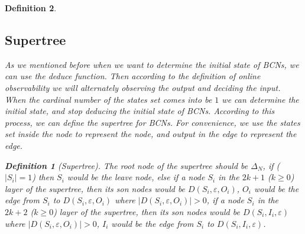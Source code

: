 \documentclass[conference]{IEEEtran} %
\newtheorem{definition}{Definition}
\begin{document}
\begin{definition}
\subsection{Supertree} As we mentioned before when we want to determine the initial state of {\em BCNs}, we can use the deduce function. Then according to the definition of online observability we will alternately observing the output and deciding the input. When the  cardinal number of the states set comes into be $1$ we can determine the initial state, and stop deducing the initial state of {\em BCNs}. According to this process, we can define the supertree for {\em BCNs}. For convenience, we use the states set inside the node to represent the node, and output in the edge to represent the edge.
\begin{definition}[Supertree]
The root node of the supertree should be $\Delta_N$, if ($|S_i|=1$) then $S_i$ would be the leave node, else if a node $S_i$ in the $2k + 1$ ($k\ge 0$) layer of the supertree, then its son nodes would be $D\left(S_i,\varepsilon, O_i\right)$, $O_i$ would be the edge from $S_i$ to $D\left(S_i,\varepsilon, O_i\right)$ where $|D\left(S_i,\varepsilon, O_i\right)|>0$, if a node $S_i$ in the $2k + 2$ ($k\ge 0$) layer of the supertree, then its son nodes would be $D\left(S_i,I_i,\varepsilon\right)$ where $|D\left(S_i,\varepsilon, O_i\right)|>0$, $I_i$ would be the edge from $S_i$ to $D\left(S_i,I_i,\varepsilon\right)$. 
\end{definition}

  \begin{figure}[thpb]
      \centering
      

\end{figure}
\end{definition}
\end{document}
